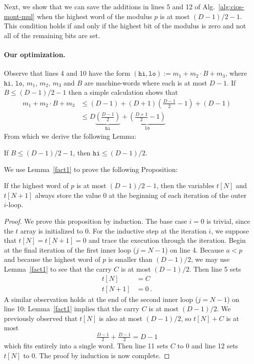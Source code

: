 \documentclass[journal=tches,spthm]{iacrtrans}
\begin{document}
Next, we show that we can save the additions in lines 5 and 12 of
Alg.~\ref{alg:cios-mont-mul} when the highest word of the modulus $p$ is at
most $(D-1)/2-1$. This condition holds if and only if the highest bit of the
modulus is zero and not all of the remaining bits are set.

\paragraph{Our optimization.}
Observe that lines 4 and 10 have the form $(\texttt{hi}, \texttt{lo}) :=
m_1+m_2\cdot B+m_3$, where $\texttt{hi}$, $\texttt{lo}$, $m_1$, $m_2$, $m_3$
and $B$ are machine-words where each is at most $D-1$. If $B \leq (D-1)/2-1$
then a simple calculation shows that
%
\begin{align*}
    m_1+m_2\cdot B+m_3 &\leq (D-1)+(D+1)(\tfrac{D-1}{2}-1)+(D-1) \\
                       &\leq D\underbrace{(\tfrac{D-1}{2})}_\texttt{hi}+\underbrace{(\tfrac{D+1}{2}-1)}_\texttt{lo}
\end{align*}
%
From which we derive the following Lemma:
%
\begin{lemma}
    \label{fact1}
    If $B \leq (D-1)/2-1$, then $\texttt{hi} \leq (D-1)/2$.
\end{lemma}
%
We use Lemma~\ref{fact1} to prove the following Proposition:
%
\begin{proposition}
    \label{fact2}
    If the highest word of $p$ is at most $(D-1)/2-1$, then the variables
    $t[N]$ and $t[N+1]$ always store the value 0 at the beginning of each
    iteration of the outer $i$-loop.
\end{proposition}
%
\begin{proof}
    We prove this proposition by induction.  The base case $i=0$ is trivial,
    since the $t$ array is initialized to 0.  For the inductive step at the
    iteration $i$, we suppose that $t[N]=t[N+1]=0$ and trace the execution
    through the iteration.  Begin at the final iteration of the first inner
    loop ($j=N-1$) on line 4. Because $a<p$ and because the highest word of $p$
    is smaller than $(D-1)/2$, we may use Lemma~\ref{fact1} to see that the
    carry $C$ is at most $(D-1)/2$.  Then line 5 sets
    \begin{align*}
    t[N] &= C \\
    t[N+1] &= 0~.
    \end{align*}
    A similar observation holds at the end of the second inner loop ($j=N-1$)
    on line 10: Lemma~\ref{fact1} implies that the carry $C$ is at most
    $(D-1)/2$.  We previously observed that $t[N]$ is also at most $(D-1)/2$,
    so $t[N] + C$ is at most
    $$ \tfrac{D-1}{2} + \tfrac{D-1}{2} = D-1$$
    which fits entirely into a single word. Then line 11 sets $C$ to 0 and line
    12 sets $t[N]$ to 0.  The proof by induction is now complete.
\end{proof}
\end{document}
